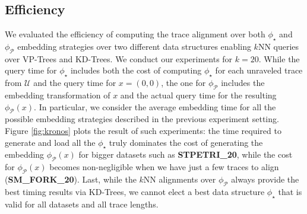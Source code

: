 \subsection{Efficiency}\label{subsec:efficio}
We evaluated the efficiency of computing the trace alignment over both $\phi_\star$ and $\phi_{\mathcal{P}}$ embedding strategies over two different data structures enabling $k$NN queries over VP-Trees and KD-Trees. We conduct our experiments for $k=20$. While the query time for $\phi_\star$ includes both the cost of computing $\phi_\star$ for each unraveled trace from $\mathcal{U}$ and the query time for $x=(0,0)$, the one for $\phi_{\mathcal{P}}$ includes the embedding transformation of $x$ and the actual query time for the resulting $\phi_{\mathcal{P}}(x)$. In particular, we consider the average embedding time for all the possible embedding strategies described in the previous experiment setting. Figure \ref{fig:kronos} plots the result of such experiments: the time required to generate and load all the $\phi_\star$ truly dominates the cost of generating the embedding $\phi_{\mathcal{P}}(x)$ for bigger datasets such as \textbf{STPETRI\_20}, while the cost for $\phi_{\mathcal{P}}(x)$ becomes non-negligible when we have just a few traces to align (\textbf{SM\_FORK\_20}). Last, while the $k$NN alignments over $\phi_{\mathcal{P}}$ always provide the best timing results via KD-Trees, we cannot elect a best data structure $\phi_\star$ that is valid for all datasets and all trace lengths. 